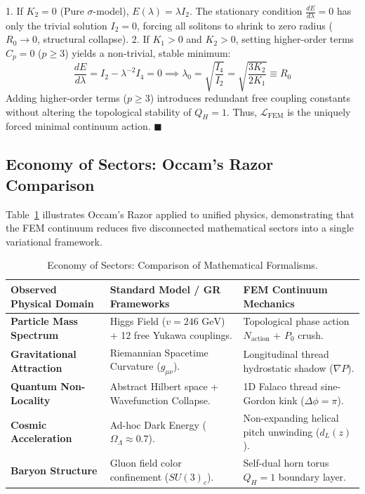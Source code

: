 \documentclass[11pt,a4paper]{article}
\begin{document}
	1. If $K_2 = 0$ (Pure $\sigma$-model), $E(\lambda) = \lambda I_2$. The stationary condition $\frac{dE}{d\lambda} = 0$ has only the trivial solution $I_2 = 0$, forcing all solitons to shrink to zero radius ($R_0 \to 0$, structural collapse).
	2. If $K_1 > 0$ and $K_2 > 0$, setting higher-order terms $C_p = 0$ ($p \ge 3$) yields a non-trivial, stable minimum:
	\begin{equation}
		\frac{dE}{d\lambda} = I_2 - \lambda^{-2} I_4 = 0 \implies \lambda_0 = \sqrt{\frac{I_4}{I_2}} = \sqrt{\frac{3 K_2}{2 K_1}} \equiv R_0
	\end{equation}
	Adding higher-order terms ($p \ge 3$) introduces redundant free coupling constants without altering the topological stability of $Q_H = 1$. Thus, $\mathcal{L}_{\text{FEM}}$ is the uniquely forced minimal continuum action. $\blacksquare$
	
	\subsection{Economy of Sectors: Occam's Razor Comparison}
	Table~\ref{tab:economy_sectors} illustrates Occam's Razor applied to unified physics, demonstrating that the FEM continuum reduces five disconnected mathematical sectors into a single variational framework.
	
	\begin{table}[H]
		\centering
		\caption{Economy of Sectors: Comparison of Mathematical Formalisms.}
		\label{tab:economy_sectors}
		\begin{tabular}{p{3.8cm}p{6.2cm}p{6.2cm}}
			\toprule
			\textbf{Observed Physical Domain} & \textbf{Standard Model / GR Frameworks} & \textbf{FEM Continuum Mechanics} \\
			\midrule
			\textbf{Particle Mass Spectrum} & Higgs Field ($v=246\text{ GeV}$) + 12 free Yukawa couplings. & Topological phase action $N_{\text{action}}$ + $P_0$ crush. \\
			\addlinespace
			\textbf{Gravitational Attraction} & Riemannian Spacetime Curvature ($g_{\mu\nu}$). & Longitudinal thread hydrostatic shadow ($\nabla P$). \\
			\addlinespace
			\textbf{Quantum Non-Locality} & Abstract Hilbert space + Wavefunction Collapse. & 1D Falaco thread sine-Gordon kink ($\Delta\phi=\pi$). \\
			\addlinespace
			\textbf{Cosmic Acceleration} & Ad-hoc Dark Energy ($\Omega_\Lambda \approx 0.7$). & Non-expanding helical pitch unwinding ($d_L(z)$). \\
			\addlinespace
			\textbf{Baryon Structure} & Gluon field color confinement ($SU(3)_c$). & Self-dual horn torus $Q_H=1$ boundary layer. \\
			\bottomrule
		\end{tabular}
	\end{table}
	
\end{document}
